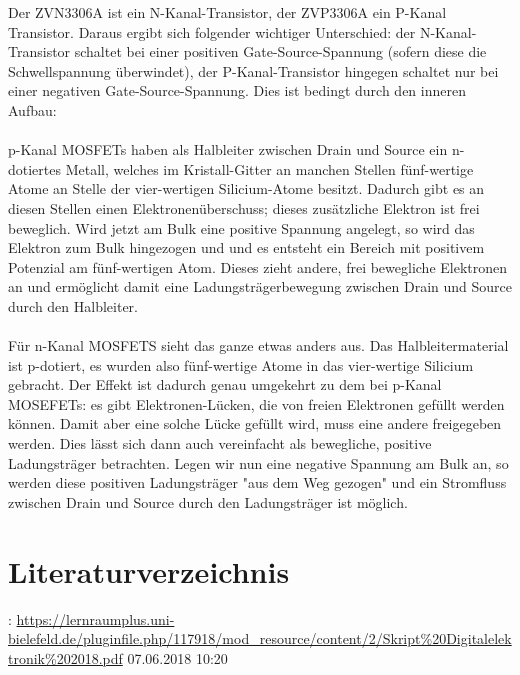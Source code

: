 \documentclass[11pt, a4paper]{article}
\begin{document}
\label{auswertung}
Der ZVN3306A ist ein N-Kanal-Transistor, der ZVP3306A ein P-Kanal Transistor. Daraus ergibt sich folgender wichtiger Unterschied: der N-Kanal-Transistor schaltet bei einer positiven Gate-Source-Spannung (sofern diese die Schwellspannung überwindet), der P-Kanal-Transistor hingegen schaltet nur bei einer negativen Gate-Source-Spannung. Dies ist bedingt durch den inneren Aufbau:
\\
\\
p-Kanal MOSFETs haben als Halbleiter zwischen Drain und Source ein n-dotiertes Metall, welches im Kristall-Gitter an manchen Stellen fünf-wertige Atome an Stelle der vier-wertigen Silicium-Atome besitzt. Dadurch gibt es an diesen Stellen einen Elektronenüberschuss; dieses zusätzliche Elektron ist frei beweglich. Wird jetzt am Bulk eine positive Spannung angelegt, so wird das Elektron zum Bulk hingezogen und und es entsteht ein Bereich mit positivem Potenzial am fünf-wertigen Atom. Dieses zieht andere, frei bewegliche Elektronen an und ermöglicht damit eine Ladungsträgerbewegung zwischen Drain und Source durch den Halbleiter.
\\
\\
Für n-Kanal MOSFETS sieht das ganze etwas anders aus. Das Halbleitermaterial ist p-dotiert, es wurden also fünf-wertige Atome in das vier-wertige Silicium gebracht. Der Effekt ist dadurch genau umgekehrt zu dem bei p-Kanal MOSEFETs: es gibt Elektronen-Lücken, die von freien Elektronen gefüllt werden können. Damit aber eine solche Lücke gefüllt wird, muss eine andere freigegeben werden. Dies lässt sich dann auch vereinfacht als bewegliche, positive Ladungsträger betrachten. Legen wir nun eine negative Spannung am Bulk an, so werden diese positiven Ladungsträger "aus dem Weg gezogen" und ein Stromfluss zwischen Drain und Source durch den Ladungsträger ist möglich.

\section*{Literaturverzeichnis}

:
\url{https://lernraumplus.uni-bielefeld.de/pluginfile.php/117918/mod_resource/content/2/Skript%20Digitalelektronik%202018.pdf}     07.06.2018 10:20
\end{document}
